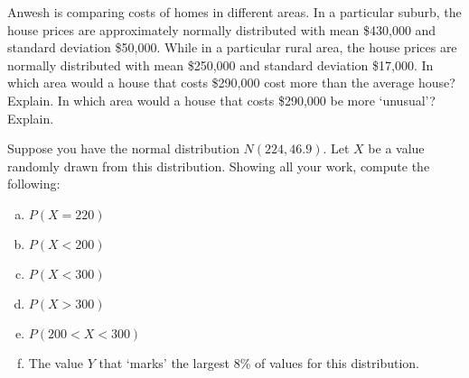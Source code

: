 \documentclass[11pt,letterpaper]{article}
\begin{document}

 Anwesh is comparing costs of homes in different areas. In a particular suburb, the house prices are approximately normally distributed with mean \$430,000 and standard deviation \$50,000. While in a particular rural area, the house prices are normally distributed with mean \$250,000 and standard deviation \$17,000. In which area would a house that costs \$290,000 cost more than the average house? Explain. In which area would a house that costs \$290,000 be more `unusual'? Explain. 



\newpage



 Suppose you have the normal distribution $N(224, 46.9)$. Let $X$ be a value randomly drawn from this distribution. Showing all your work, compute the following:
	\begin{enumerate}[(a)]
	\item $P(X= 220)$
	\item $P(X < 200)$
	\item $P(X < 300)$
	\item $P(X > 300)$
	\item $P(200 < X < 300)$
	\item The value $Y$ that `marks' the largest 8\% of values for this distribution. 
	\end{enumerate}
\end{document}
